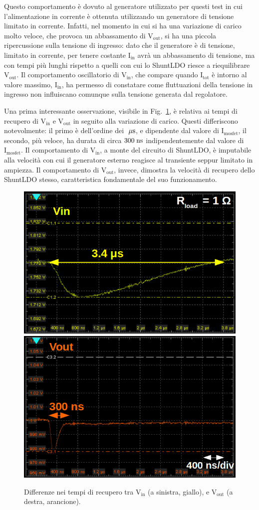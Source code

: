 Questo comportamento è dovuto al generatore utilizzato per questi test in cui l'alimentazione in corrente è ottenuta utilizzando un generatore di tensione limitato in corrente. 
Infatti, nel momento in cui si ha una variazione di carico molto veloce, che provoca un abbassamento di $\mathrm{V_{out}}$, si ha una piccola ripercussione sulla tensione di ingresso: dato che il generatore è di tensione, limitato in corrente, per tenere costante $\mathrm{I_{in}}$ avrà un abbassamento di tensione, ma con tempi più lunghi rispetto a quelli con cui lo ShuntLDO riesce a riequilibrare $\mathrm{V_{out}}$.
Il comportamento oscillatorio di $\mathrm{V_{in}}$, che compare quando $\mathrm{I_{tot}}$ è intorno al valore massimo, $\mathrm{I_{in}}$, ha permesso di constatare come fluttuazioni della tensione in ingresso non influiscano comunque sulla tensione generata dal regolatore.

Una prima interessante osservazione, visibile in Fig.~\ref{DipVoutVin}, \`e relativa ai tempi di recupero di $\mathrm{V_{in}}$ e $\mathrm{V_{out}}$ in seguito alla variazione di carico. Questi differiscono notevolmente: il primo è dell'ordine dei $\; \mu \rm s$, e dipendente dal valore di $\mathrm{I_{mosfet}}$, il secondo, più veloce, ha durata di circa $300\rm \; ns$ indipendentemente dal valore di $\mathrm{I_{mosfet}}$. Il comportamento di $\mathrm{V_{in}}$, a monte del circuito di ShuntLDO, è imputabile alla velocità con cui il generatore esterno reagisce al transiente seppur limitato in ampiezza. Il comportamento di $\mathrm{V_{out}}$, invece, dimostra la velocità di recupero dello ShuntLDO stesso, caratteristica fondamentale del suo funzionamento.
\begin{figure}
  \includegraphics[width=.48\linewidth]{Immagini/zoomDipendenzaVoutdaVin1}
  \hfill
  \includegraphics[width=.48\linewidth]{Immagini/zoomDipendenzaVoutdaVin2}
\caption{Differenze nei tempi di recupero tra $\mathrm{V_{in}}$ (a sinistra, giallo), e $\mathrm{V_{out}}$ (a destra, arancione).}
\label{DipVoutVin}
\end{figure}


